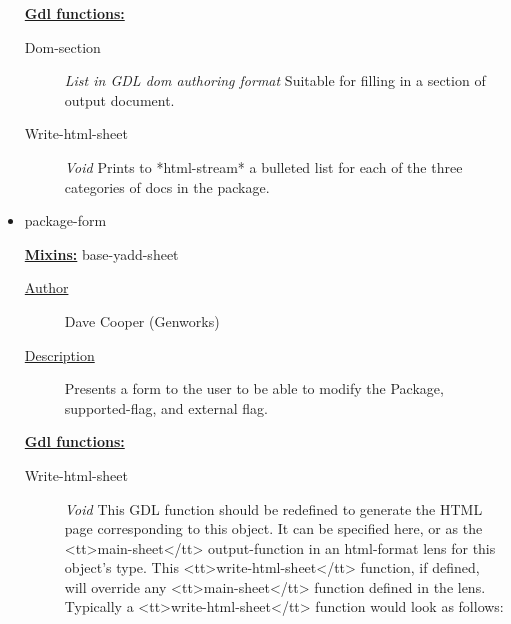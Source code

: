 \documentclass [11pt]{book}
\begin{document}
\begin{itemize}
\textbf{
\underline{Gdl functions:}}

\begin{description}

\item [Dom-section]
\emph{List in GDL dom authoring format} Suitable for filling in a section of output document.


\item [Write-html-sheet]
\emph{Void} Prints to *html-stream* a bulleted list for each of the three categories of docs in the package.


\end{description}







\item {}package-form


\textbf{
\underline{Mixins:}} base-yadd-sheet





\begin{description}

\item [
\underline{Author}]


Dave Cooper (Genworks)



\item [
\underline{Description}]


Presents a form to the user to be able to modify the Package, 
supported-flag, and external flag.



\end{description}








\textbf{
\underline{Gdl functions:}}

\begin{description}

\item [Write-html-sheet]
\emph{Void} This GDL function should be redefined to generate the HTML page corresponding to this object.
It can be specified here, or as the <tt>main-sheet</tt> output-function in an html-format lens for this
object's type. This <tt>write-html-sheet</tt> function, if defined,  will override any <tt>main-sheet</tt>
function defined in the lens. Typically a <tt>write-html-sheet</tt> function would look as follows:


\end{description}







\end{itemize}
\end{document}
